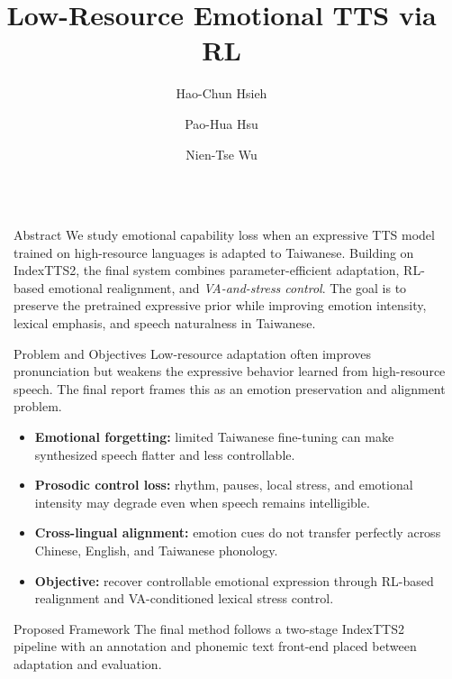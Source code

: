 \documentclass[final,20pt]{beamer}
\title{Low-Resource Emotional TTS via RL}
\author{Hao-Chun Hsieh \and Pao-Hua Hsu \and Nien-Tse Wu}
\institute[shortinst]{Institute of Artificial Intelligence Innovation, National Yang Ming Chiao Tung University}
\newlength{\sepwidth}
\newlength{\colwidth}
\newcommand{\separatorcolumn}{\begin{column}{\sepwidth}\end{column}}
\begin{document}
\begin{frame}[t]
\begin{columns}[t]
\separatorcolumn

\begin{column}{\colwidth}

  \begin{block}{Abstract}
    We study emotional capability loss when an expressive TTS model trained on
    high-resource languages is adapted to Taiwanese. Building on IndexTTS2, the
    final system combines parameter-efficient adaptation, RL-based emotional
    realignment, and \emph{VA-and-stress control}. The goal is to preserve the
    pretrained expressive prior while improving emotion intensity, lexical
    emphasis, and speech naturalness in Taiwanese.
  \end{block}

  \begin{alertblock}{Problem and Objectives}
    Low-resource adaptation often improves pronunciation but weakens the
    expressive behavior learned from high-resource speech. The final report
    frames this as an emotion preservation and alignment problem.

    \begin{itemize}
      \item \textbf{Emotional forgetting:} limited Taiwanese fine-tuning can make
      synthesized speech flatter and less controllable.
      \item \textbf{Prosodic control loss:} rhythm, pauses, local stress, and
      emotional intensity may degrade even when speech remains intelligible.
      \item \textbf{Cross-lingual alignment:} emotion cues do not transfer
      perfectly across Chinese, English, and Taiwanese phonology.
      \item \textbf{Objective:} recover controllable emotional expression through
      RL-based realignment and VA-conditioned lexical stress control.
    \end{itemize}
  \end{alertblock}

  \begin{block}{Proposed Framework}
    The final method follows a two-stage IndexTTS2 pipeline with an annotation
    and phonemic text front-end placed between adaptation and evaluation.


\end{block}
\end{column}
\end{columns}
\end{frame}
\end{document}
